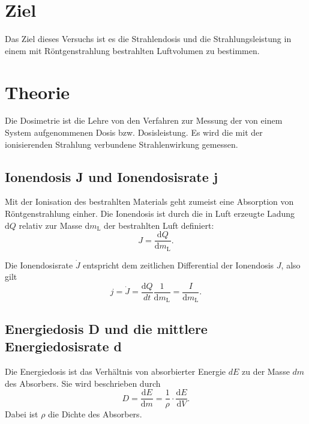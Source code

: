 \section{Ziel}
Das Ziel dieses Versuchs ist es die Strahlendosis und die
Strahlungsleistung in einem mit Röntgenstrahlung bestrahlten
Luftvolumen zu bestimmen.

\section{Theorie}
\label{sec:Theorie}

Die Dosimetrie ist die Lehre von den Verfahren zur Messung 
der von einem System aufgenommenen Dosis bzw. Dosisleistung.
Es wird die mit der ionisierenden Strahlung
verbundene Strahlenwirkung gemessen.


\subsection{Ionendosis J und Ionendosisrate j}
Mit der Ionisation des bestrahlten Materials geht zumeist
eine Absorption von Röntgenstrahlung einher. %
Die Ionendosis ist durch die in Luft erzeugte Ladung $\text{d}Q$
relativ zur Masse $\text{d}m_\text{L}$ der bestrahlten Luft definiert:
\begin{equation*}
    J = \frac{\text{d}Q}{\text{d}m_\text{L}}.
    \label{eqn:Ionendosis}
\end{equation*}

\noindent Die Ionendosisrate $\dot{J}$ entspricht dem zeitlichen Differential der Ionendosis $J$, also gilt 
\begin{equation}
    j = \dot{J} =\frac{\text{d}Q}{dt} \frac{1}{\text{d}m_\text{L}} =\frac{I}{\text{d}m_\text{L}}.
    \label{eqn:Ionendosisrate}
\end{equation}

\subsection{Energiedosis D und die mittlere Energiedosisrate d}
Die Energiedosis ist das Verhältnis von absorbierter
Energie $dE$ zu der Masse $dm$ des Absorbers.
Sie wird beschrieben durch
\begin{equation*}
    D = \frac{\text{d}E}{\text{d}m} = \frac{1}{\rho} \cdot \frac{\text{d}E}{\text{d}V}.
    \label{eqn:Energiedosis}
\end{equation*}
Dabei ist $\rho$ die Dichte des Absorbers.

